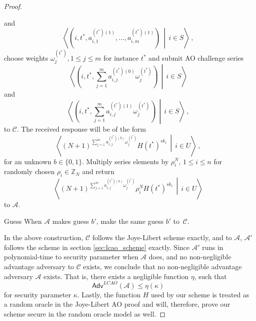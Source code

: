 \documentclass[10pt,letterpaper,oneside,twocolumn,journal]{IEEEtran}
\theoremstyle{definition}
\theoremstyle{definition}
\theoremstyle{remark}
\begin{document}
\begin{proof}
\begin{LaTeXdescription}
\begin{equation*}
        \end{equation*}
        and
        \begin{equation*}
            \left\langle\left(i,t^*,a^{(t^*)(1)}_{i,1},\dots,a^{(t^*)(1)}_{i,m}\right)\,\middle|\, i \in S\right\rangle\,,
        \end{equation*}
        choose weights $\omega^{(t^*)}_j,1 \leq j \leq m$ for instance $t^*$ and submit AO challenge series
        \begin{equation*}
            \left\langle\left(i,t^*,\sum^m_{j=1}a^{(t^*)(0)}_{i,j}\omega^{(t^*)}_j\right)\,\middle|\,i \in S\right\rangle
        \end{equation*}
        and
        \begin{equation*}
            \left\langle\left(i,t^*,\sum^m_{j=1}a^{(t^*)(1)}_{i,j}\omega^{(t^*)}_j\right)\,\middle|\,i \in S\right\rangle\,,
        \end{equation*}
        to $\mathcal{C}$. The received response will be of the form 
        \begin{equation*}
            \left\langle(N+1)^{\sum^m_{j=1}a^{(t^*)(b)}_{i,j}\omega^{(t^*)}_j}H(t^*)^{sk_i}\,\middle|\,i\in U\right\rangle\,,
        \end{equation*}
        for an unknown $b \in \{0,1\}$. Multiply series elements by $\rho_i^N,\,1 \leq i \leq n$ for randomly chosen $\rho_i \in \mathbb{Z}_N$ and return
        \begin{equation*}
            \left\langle(N+1)^{\sum^m_{j=1}a^{(t^*)(b)}_{i,j}\omega^{(t^*)}_j}\rho_i^N H(t^*)^{sk_i}\,\middle|\,i\in U\right\rangle
        \end{equation*}
        to $\mathcal{A}$.
        \item[Guess] When $\mathcal{A}$ makes guess $b'$, make the same guess $b'$ to~$\mathcal{C}$.
    \end{LaTeXdescription}

    In the above construction, $\mathcal{C}$ follows the Joye-Libert scheme exactly, and to $\mathcal{A}$, $\mathcal{A}'$ follows the scheme in section \ref{sec:lcao_scheme} exactly. Since $\mathcal{A}'$ runs in polynomial-time to security parameter when $\mathcal{A}$ does, and no non-negligible advantage adversary to $\mathcal{C}$ exists, we conclude that no non-negligible advantage adversary $\mathcal{A}$ exists. That is, there exists a negligible function $\eta$, such that
    \begin{equation*}
        \mathsf{Adv}^{LCAO}(\mathcal{A}) \leq \eta(\kappa)
    \end{equation*}
    for security parameter $\kappa$. Lastly, the function $H$ used by our scheme is treated as a random oracle in the Joye-Libert AO proof and will, therefore, prove our scheme secure in the random oracle model as well.
\end{proof}
\end{document}
